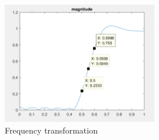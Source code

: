\documentclass[twoside]{article}
\begin{document}
\begin{figure}[H]
   \centering
   \includegraphics[width = 0.6\textwidth]{./data/solution4b.png}  
   \caption{Frequency transformation}
\end{figure}
\end{document}
